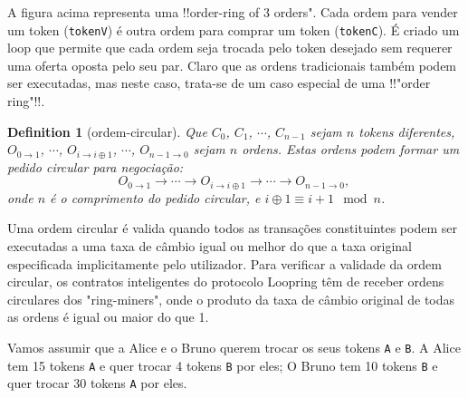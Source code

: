\documentclass[UTF8,nofonts]{article}
\newtheorem{definition}{Definition}[section]
\begin{document}
\begin{multicols}{2}
A figura acima representa uma !!order-ring of 3 orders". Cada ordem para vender um token (\verb|tokenV|) é outra ordem para comprar um token (\verb|tokenC|). É criado um loop que permite que cada ordem seja trocada pelo token desejado sem requerer uma oferta oposta pelo seu par. Claro que as ordens tradicionais também podem ser executadas, mas neste caso, trata-se de um caso especial de uma !!"order ring"!!.

\begin{definition}[ordem-circular] Que $C_{0}$, $C_{1}$, $\cdots$, $C_{n-1}$ sejam $n$ tokens diferentes, $O_{0\rightarrow 1}$, $\cdots$, $O_{i\rightarrow i\oplus 1}$, $\cdots$, $O_{n-1 \rightarrow 0}$ sejam $n$ ordens. Estas ordens podem formar um pedido circular para negociação:
$$O_{0\rightarrow 1} \rightarrow \cdots \rightarrow O_{i\rightarrow i\oplus 1} \rightarrow \cdots \rightarrow O_{n-1\rightarrow 0} \text{, }$$
onde $n$ é o comprimento do pedido circular, e $i\oplus 1 \equiv i+1 \mod n$.
\end{definition}

Uma ordem circular é valida quando todos as transações constituintes podem ser executadas a uma taxa de câmbio igual ou melhor do que a taxa original especificada implicitamente pelo utilizador. Para verificar a validade da ordem circular, os contratos inteligentes do protocolo Loopring têm de receber ordens circulares dos "ring-miners", onde o produto da taxa de câmbio original de todas as ordens é igual ou maior do que 1.

Vamos assumir que a Alice e o Bruno querem trocar os seus tokens \verb|A| e \verb|B|. A Alice tem 15 tokens \verb|A| e quer trocar 4 tokens \verb|B| por eles; O Bruno tem 10 tokens \verb|B| e quer trocar 30 tokens \verb|A| por eles.


\end{multicols}
\end{document}
